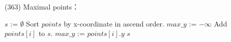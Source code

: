\item \begin{theorem}{(363)} Maximal points：
    \begin{algorithm}[H]
        \begin{algorithmic}[1]
                \State $s$ := $\emptyset$
                \State Sort $points$ by x-coordinate in ascend order.
                \State $max\_y$ := $-\infty$
                        \State Add $points[i]$ to $s$.
                        \State $max\_y$ := $points[i].y$
                    \EndIf
                \EndFor
                \State \Return $s$
            \EndFunction
        \end{algorithmic}
    \end{algorithm}
\end{theorem}
